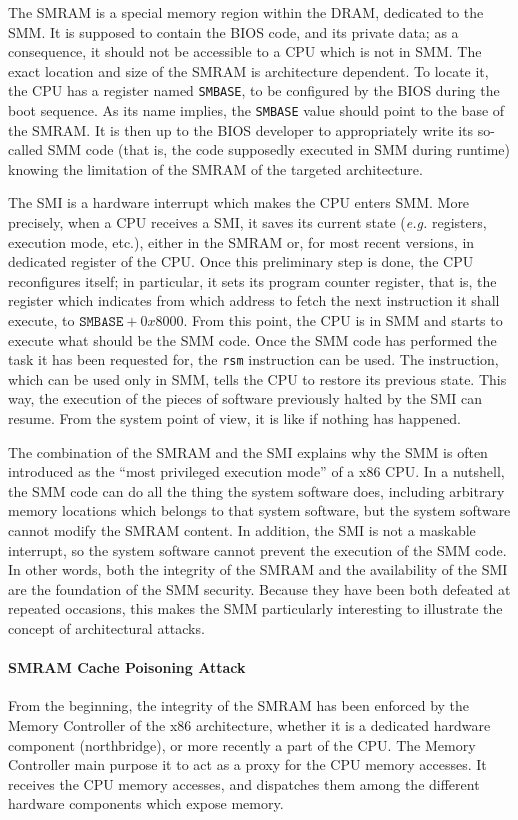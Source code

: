 The SMRAM is a special memory region within the DRAM, dedicated to the SMM.
%
It is supposed to contain the BIOS code, and its private data;
%
as a consequence, it should not be accessible to a CPU which is not in SMM.
%
The exact location and size of the SMRAM is architecture dependent.
%
To locate it, the CPU has a register named \texttt{SMBASE}, to be configured by
the BIOS during the boot sequence.
%
As its name implies, the \texttt{SMBASE} value should point to the base of the
SMRAM.
%
It is then up to the BIOS developer to appropriately write its so-called SMM
code (that is, the code supposedly executed in SMM during runtime) knowing the
limitation of the SMRAM of the targeted architecture.

The SMI is a hardware interrupt which makes the CPU enters SMM.
%
More precisely, when a CPU receives a SMI, it saves its current state
(\emph{e.g.} registers, execution mode, etc.), either in the SMRAM or, for most
recent versions, in dedicated register of the CPU.
%
Once this preliminary step is done, the CPU reconfigures itself;
%
in particular, it sets its program counter register, that is, the register which
indicates from which address to fetch the next instruction it shall execute, to
$\texttt{SMBASE} + 0x8000$.
%
From this point, the CPU is in SMM and starts to execute what should be the SMM
code.
%
Once the SMM code has performed the task it has been requested for, the
\texttt{rsm} instruction can be used.
%
The instruction, which can be used only in SMM, tells the CPU to restore its
previous state.
%
This way, the execution of the pieces of software previously halted by the SMI
can resume.
%
From the system point of view, it is like if nothing has happened.

The combination of the SMRAM and the SMI explains why the SMM is often
introduced as the ``most privileged execution mode'' of a x86 CPU.
%
In a nutshell, the SMM code can do all the thing the system software does,
including arbitrary memory locations which belongs to that system software, but
the system software cannot modify the SMRAM content.
%
In addition, the SMI is not a maskable interrupt, so the system software cannot
prevent the execution of the SMM code.
%
In other words, both the integrity of the SMRAM and the availability of the SMI
are the foundation of the SMM security.
%
Because they have been both defeated at repeated occasions, this makes the SMM
particularly interesting to illustrate the concept of architectural attacks.

\paragraph{SMRAM Cache Poisoning Attack}
%
From the beginning, the integrity of the SMRAM has been enforced by the Memory
Controller of the x86 architecture, whether it is a dedicated hardware component
(northbridge), or more recently a part of the CPU.
%
The Memory Controller main purpose it to act as a proxy for the CPU memory
accesses.
%
It receives the CPU memory accesses, and dispatches them among the different
hardware components which expose memory.

